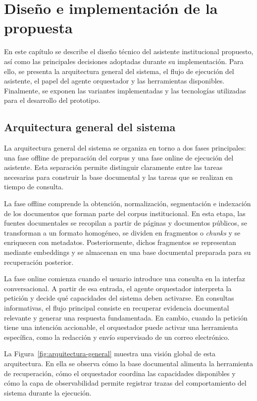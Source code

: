 \chapter{Diseño e implementación de la propuesta}\label{chap:diseno-implementacion}

En este capítulo se describe el diseño técnico del asistente institucional propuesto, así como las principales decisiones adoptadas durante su implementación. 
Para ello, se presenta la arquitectura general del sistema, el flujo de ejecución del asistente, el papel del agente orquestador y las herramientas disponibles. 
Finalmente, se exponen las variantes implementadas y las tecnologías utilizadas para el desarrollo del prototipo.

\section{Arquitectura general del sistema}\label{sec:arquitectura-general}

La arquitectura general del sistema se organiza en torno a dos fases principales: una fase offline de preparación del corpus y una fase online de ejecución del asistente. 
Esta separación permite distinguir claramente entre las tareas necesarias para construir la base documental y las tareas que se realizan en tiempo de consulta.

La fase offline comprende la obtención, normalización, segmentación e indexación de los documentos que forman parte del corpus institucional. 
En esta etapa, las fuentes documentales se recopilan a partir de páginas y documentos públicos, se transforman a un formato homogéneo, se dividen en fragmentos o \textit{chunks} y se enriquecen con metadatos. 
Posteriormente, dichos fragmentos se representan mediante embeddings y se almacenan en una base documental preparada para su recuperación posterior.

La fase online comienza cuando el usuario introduce una consulta en la interfaz conversacional. 
A partir de esa entrada, el agente orquestador interpreta la petición y decide qué capacidades del sistema deben activarse. 
En consultas informativas, el flujo principal consiste en recuperar evidencia documental relevante y generar una respuesta fundamentada. 
En cambio, cuando la petición tiene una intención accionable, el orquestador puede activar una herramienta específica, como la redacción y envío supervisado de un correo electrónico.

La Figura~\ref{fig:arquitectura-general} muestra una visión global de esta arquitectura. 
En ella se observa cómo la base documental alimenta la herramienta de recuperación, cómo el orquestador coordina las capacidades disponibles y cómo la capa de observabilidad permite registrar trazas del comportamiento del sistema durante la ejecución.

